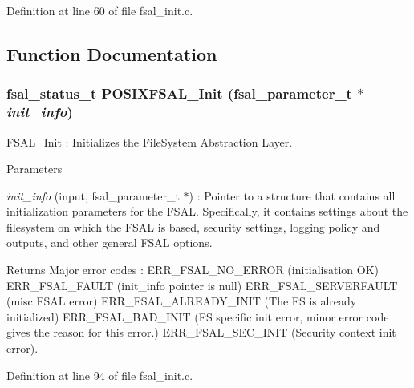 Definition at line 60 of file fsal\_\-init.c.

\subsection{Function Documentation}
\subsubsection[{POSIXFSAL\_\-Init}]{\setlength{\rightskip}{0pt plus 5cm}fsal\_\-status\_\-t POSIXFSAL\_\-Init (fsal\_\-parameter\_\-t $\ast$ {\em init\_\-info})}\label{fsal__init_8c_a671fba6115decc7dc97a719d3f41464f}
FSAL\_\-Init : Initializes the FileSystem Abstraction Layer.


\begin{DoxyParams}{Parameters}
\item[{\em init\_\-info}](input, fsal\_\-parameter\_\-t $\ast$) : Pointer to a structure that contains all initialization parameters for the FSAL. Specifically, it contains settings about the filesystem on which the FSAL is based, security settings, logging policy and outputs, and other general FSAL options.\end{DoxyParams}
\begin{DoxyReturn}{Returns}
Major error codes : ERR\_\-FSAL\_\-NO\_\-ERROR (initialisation OK) ERR\_\-FSAL\_\-FAULT (init\_\-info pointer is null) ERR\_\-FSAL\_\-SERVERFAULT (misc FSAL error) ERR\_\-FSAL\_\-ALREADY\_\-INIT (The FS is already initialized) ERR\_\-FSAL\_\-BAD\_\-INIT (FS specific init error, minor error code gives the reason for this error.) ERR\_\-FSAL\_\-SEC\_\-INIT (Security context init error). 
\end{DoxyReturn}


Definition at line 94 of file fsal\_\-init.c.